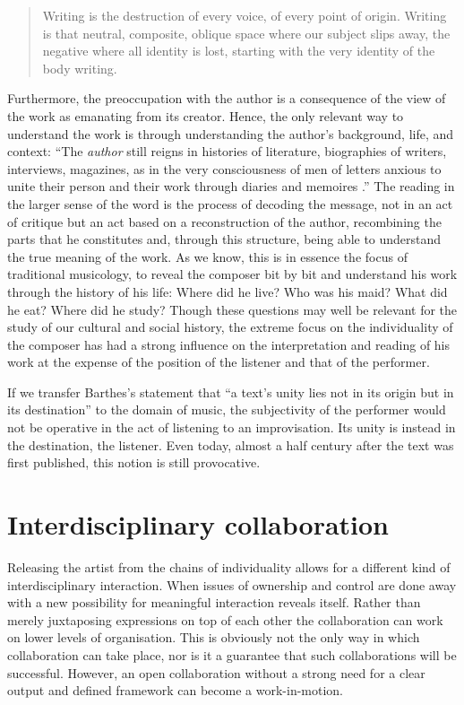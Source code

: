 \documentclass[a4paper,hidelinks]{article}
\begin{document}
\begin{quote}
Writing is the destruction of every voice, of every point of origin. Writing is that neutral, composite, oblique space where our subject slips away, the negative where all identity is lost, starting with the very identity of the body writing. \citep[p. 142]{barthes77}
\end{quote}

Furthermore, the preoccupation with the author is a consequence of the view of the work as emanating from its creator. Hence, the only relevant way to understand the work is through understanding the author's background, life, and context: ``The \emph{author} still reigns in histories of literature, biographies of writers, interviews, magazines, as in the very consciousness of men of letters anxious to unite their person and their work through diaries and memoires \citep[p. 143]{barthes77}.'' The reading in the larger sense of the word is the process of decoding the message, not in an act of critique but an act based on a reconstruction of the author, recombining the parts that he constitutes and, through this structure, being able to understand the true meaning of the work. As we know, this is in essence the focus of traditional musicology, to reveal the composer bit by bit and understand his work through the history of his life: Where did he live? Who was his maid? What did he eat? Where did he study? Though these questions may well be relevant for the study of our cultural and social history, the extreme focus on the individuality of the composer has had a strong influence on the interpretation and reading of his work at the expense of the position of the listener and that of the performer.

If we transfer Barthes's statement that ``a text's unity lies not in its origin but in its destination'' \citep[][p. 148]{barthes77} to the domain of music, the subjectivity of the performer would not be operative in the act of listening to an improvisation. Its unity is instead in the destination, the listener. Even today, almost a half century after the text was first published, this notion is still provocative.

\section{Interdisciplinary collaboration}

Releasing the artist from the chains of individuality allows for a different kind of interdisciplinary interaction. When issues of ownership and control are done away with a new possibility for meaningful interaction reveals itself. Rather than merely juxtaposing expressions on top of each other the collaboration can work on lower levels of organisation. This is obviously not the only way in which collaboration can take place, nor is it a guarantee that such collaborations will be successful. However, an open collaboration without a strong need for a clear output and defined framework can become a work-in-motion.
\end{document}
